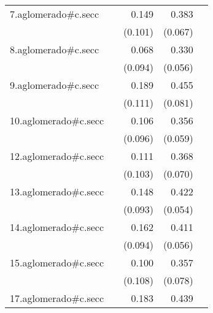 {\begin{longtable}{l*{4}{D{.}{.}{-1}}}
\addlinespace
7.aglomerado#c.secc&                     &       0.149         &       0.383\sym{***}&                     \\
            &                     &     (0.101)         &     (0.067)         &                     \\
\addlinespace
8.aglomerado#c.secc&                     &       0.068         &       0.330\sym{***}&                     \\
            &                     &     (0.094)         &     (0.056)         &                     \\
\addlinespace
9.aglomerado#c.secc&                     &       0.189         &       0.455\sym{***}&                     \\
            &                     &     (0.111)         &     (0.081)         &                     \\
\addlinespace
10.aglomerado#c.secc&                     &       0.106         &       0.356\sym{***}&                     \\
            &                     &     (0.096)         &     (0.059)         &                     \\
\addlinespace
12.aglomerado#c.secc&                     &       0.111         &       0.368\sym{***}&                     \\
            &                     &     (0.103)         &     (0.070)         &                     \\
\addlinespace
13.aglomerado#c.secc&                     &       0.148         &       0.422\sym{***}&                     \\
            &                     &     (0.093)         &     (0.054)         &                     \\
\addlinespace
14.aglomerado#c.secc&                     &       0.162         &       0.411\sym{***}&                     \\
            &                     &     (0.094)         &     (0.056)         &                     \\
\addlinespace
15.aglomerado#c.secc&                     &       0.100         &       0.357\sym{***}&                     \\
            &                     &     (0.108)         &     (0.078)         &                     \\
\addlinespace
17.aglomerado#c.secc&                     &       0.183         &       0.439\sym{***}&                     \\

\end{longtable}}
